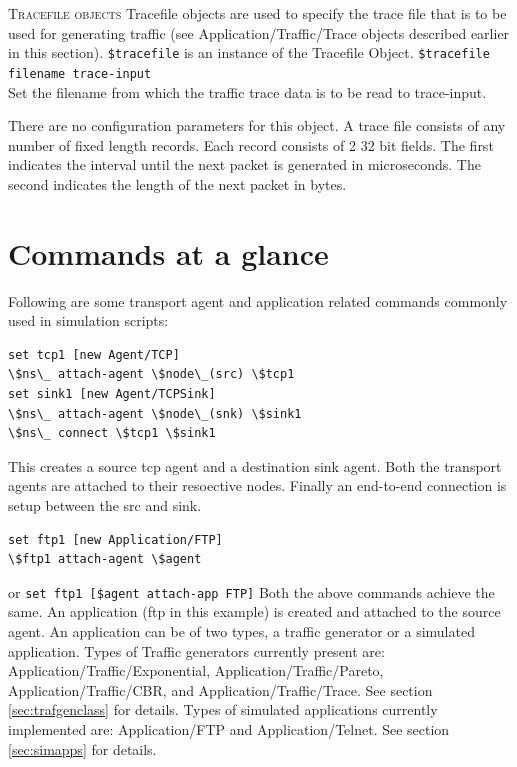 \textsc{Tracefile objects}
Tracefile objects are used to specify the trace file that is to be used
for generating traffic (see Application/Traffic/Trace objects
described earlier in this section). {\tt \$tracefile} is an instance of
the Tracefile Object. 
{\tt \$tracefile filename \<trace-input\>}\\
Set the filename from which the traffic trace data is to be read to
trace-input. 

There are no configuration parameters for this object. A trace file
consists of any number of fixed length records. Each record consists of 2
32 bit fields. The first indicates the interval until the next packet is
generated in microseconds. The second indicates the length of the next
packet in bytes. 



\section{Commands at a glance}
\label{sec:appscommand}

Following are some transport agent and application related commands
commonly used in simulation scripts:
\begin{flushleft}
\begin{verbatim}
set tcp1 [new Agent/TCP]
\$ns\_ attach-agent \$node\_(src) \$tcp1
set sink1 [new Agent/TCPSink]
\$ns\_ attach-agent \$node\_(snk) \$sink1
\$ns\_ connect \$tcp1 \$sink1
\end{verbatim}
This creates a source tcp agent and a destination sink agent. Both the transport
agents are attached to their resoective nodes. Finally an end-to-end connection
is setup between the src and sink.


\begin{verbatim}
set ftp1 [new Application/FTP]
\$ftp1 attach-agent \$agent
\end{verbatim}
or
{\tt set ftp1 [\$agent attach-app FTP]}
Both the above commands achieve the same. An application (ftp in this example)
is created and attached to the source agent. An application can be of two
types, a traffic generator or a simulated application.
Types of Traffic generators currently present are: 
Application/Traffic/Exponential, Application/Traffic/Pareto,
Application/Traffic/CBR, and Application/Traffic/Trace. See section \ref{sec:trafgenclass}
for details.
Types of simulated applications currently implemented are:
Application/FTP and Application/Telnet. See  section \ref{sec:simapps} for
details.

\end{flushleft}

\endinput
